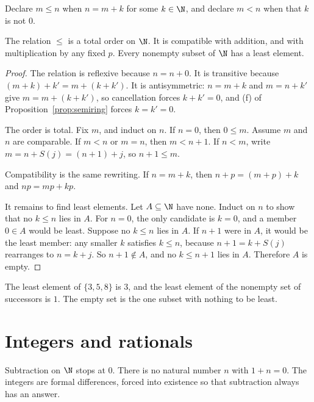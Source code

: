 Declare $m\le n$ when $n=m+k$ for some $k\in\N$, and declare $m<n$ when that $k$ is not $0$.

\begin{proposition}\label{prop:wellorder}
The relation $\le$ is a total order on $\N$. It is compatible with addition, and with multiplication by any fixed $p$. Every nonempty subset of $\N$ has a least element.
\end{proposition}
\begin{proof}
The relation is reflexive because $n=n+0$. It is transitive because $(m+k)+k'=m+(k+k')$. It is antisymmetric: $n=m+k$ and $m=n+k'$ give $m=m+(k+k')$, so cancellation forces $k+k'=0$, and (f) of Proposition~\ref{prop:semiring} forces $k=k'=0$.

The order is total. Fix $m$, and induct on $n$. If $n=0$, then $0\le m$. Assume $m$ and $n$ are comparable. If $m<n$ or $m=n$, then $m<n+1$. If $n<m$, write $m=n+S(j)=(n+1)+j$, so $n+1\le m$.

Compatibility is the same rewriting. If $n=m+k$, then $n+p=(m+p)+k$ and $np=mp+kp$.

It remains to find least elements. Let $A\subseteq\N$ have none. Induct on $n$ to show that no $k\le n$ lies in $A$. For $n=0$, the only candidate is $k=0$, and a member $0\in A$ would be least. Suppose no $k\le n$ lies in $A$. If $n+1$ were in $A$, it would be the least member: any smaller $k$ satisfies $k\le n$, because $n+1=k+S(j)$ rearranges to $n=k+j$. So $n+1\notin A$, and no $k\le n+1$ lies in $A$. Therefore $A$ is empty.
\end{proof}

The least element of $\{3,5,8\}$ is $3$, and the least element of the nonempty set of successors is $1$. The empty set is the one subset with nothing to be least.

\section{Integers and rationals}

Subtraction on $\N$ stops at $0$. There is no natural number $n$ with $1+n=0$. The integers are formal differences, forced into existence so that subtraction always has an answer.

